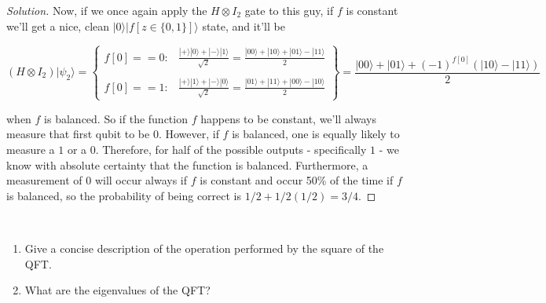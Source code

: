 \documentclass[12pt]{article}
\newenvironment{problem}[2][Problem]{\begin{trivlist}
\item[\hskip \labelsep {\bfseries #1}\hskip \labelsep {\bfseries #2.}]}{\end{trivlist}}
\begin{document}
\begin{proof}[Solution]
Now, if we once again apply the $H\otimes I_2$ gate to this guy, if $f$ is constant we'll get a nice, clean $|0\rangle|f[z\in\{0,1\}]\rangle$ state, and it'll be 

\[
\left(H\otimes I_2\right)|\psi_2\rangle = \left\{\begin{array}{lr}
f[0]==0: & \frac{|+\rangle|0\rangle+|-\rangle|1\rangle}{\sqrt{2}} =\frac{|00\rangle+|10\rangle+|01\rangle-|11\rangle}{2}\\
&\\
f[0]==1: & \frac{|+\rangle|1\rangle+|-\rangle|0\rangle}{\sqrt{2}}=\frac{|01\rangle+|11\rangle+|00\rangle-|10\rangle}{2}
\end{array}\right\}=\frac{|00\rangle+|01\rangle+(-1)^{f[0]}(|10\rangle-|11\rangle)}{2}
\]

when $f$ is balanced. So if the function $f$ happens to be constant, we'll always measure that first qubit to be $0$. However, if $f$ is balanced, one is equally likely to measure a $1$ or a $0$. Therefore, for half of the possible outputs - specifically $1$ - we know with absolute certainty that the function is balanced. Furthermore, a measurement of $0$ will occur always if $f$ is constant and occur 50\% of the time if $f$ is balanced, so the probability of being correct is $1/2+1/2(1/2)=3/4$.

\end{proof}

\begin{problem}{7.1.4}~\\
\begin{enumerate}[label=(\alph*)]
\item Give a concise description of the operation performed by the square of the QFT.
\item What are the eigenvalues of the QFT?
\end{enumerate}
\end{problem}
\end{document}
